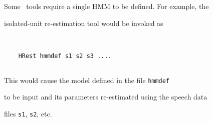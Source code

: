 




Some \HTK\ tools require a single HMM to be defined.  For example, the


isolated-unit re-estimation tool  would be invoked as


\begin{verbatim}


    HRest hmmdef s1 s2 s3 ....


\end{verbatim}





\noindent


This would cause the model defined in the file \texttt{hmmdef}


to be input and its parameters re-estimated using the speech data


files \texttt{s1}, \texttt{s2}, etc.





